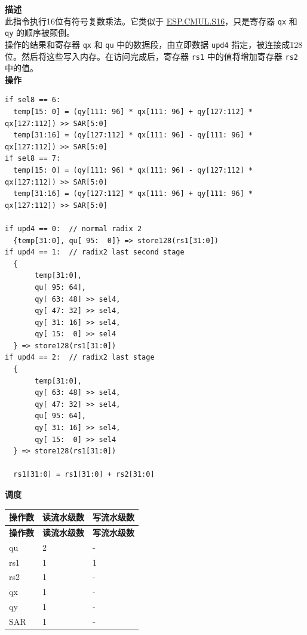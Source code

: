 \textbf{描述}\\
此指令执行16位有符号复数乘法。它类似于 \hyperref[instruction:ESPCMULS16]{ESP.CMUL.S16}，只是寄存器 \lstinline{qx} 和 \lstinline{qy} 的顺序被颠倒。\\
操作的结果和寄存器 \lstinline{qx} 和 \lstinline{qu} 中的数据段，由立即数据 \lstinline{upd4} 指定，被连接成128位。然后将这些写入内存。在访问完成后，寄存器 \lstinline{rs1} 中的值将增加寄存器 \lstinline{rs2} 中的值。\\
\textbf{操作}
\begin{lstlisting}
if sel8 == 6:
  temp[15: 0] = (qy[111: 96] * qx[111: 96] + qy[127:112] * qx[127:112]) >> SAR[5:0]
  temp[31:16] = (qy[127:112] * qx[111: 96] - qy[111: 96] * qx[127:112]) >> SAR[5:0]
if sel8 == 7:
  temp[15: 0] = (qy[111: 96] * qx[111: 96] - qy[127:112] * qx[127:112]) >> SAR[5:0]
  temp[31:16] = (qy[127:112] * qx[111: 96] + qy[111: 96] * qx[127:112]) >> SAR[5:0]

if upd4 == 0:  // normal radix 2
  {temp[31:0], qu[ 95:  0]} => store128(rs1[31:0])
if upd4 == 1:  // radix2 last second stage
  {
       temp[31:0],
       qu[ 95: 64],
       qy[ 63: 48] >> sel4,
       qy[ 47: 32] >> sel4,
       qy[ 31: 16] >> sel4,
       qy[ 15:  0] >> sel4
  } => store128(rs1[31:0])
if upd4 == 2:  // radix2 last stage
  {
       temp[31:0],
       qy[ 63: 48] >> sel4,
       qy[ 47: 32] >> sel4,
       qu[ 95: 64],
       qy[ 31: 16] >> sel4,
       qy[ 15:  0] >> sel4
  } => store128(rs1[31:0])

  rs1[31:0] = rs1[31:0] + rs2[31:0]
\end{lstlisting}

\textbf{调度}\\
\begin{longtable}[c]{|l|l|l|}
    \hline
    \rowcolor{lightgray}
    \textbf{操作数} & \textbf{读流水级数} & \textbf{写流水级数} \\\hline
    \endfirsthead
    \hline
    \rowcolor{lightgray}
     \textbf{操作数} & \textbf{读流水级数} & \textbf{写流水级数} \\\hline
    \endhead
    \hline
    \endfoot

  qu & 2 & - \\\hline
  rs1 & 1 & 1 \\\hline
  rs2 & 1 & - \\\hline
  qx & 1 & - \\\hline
  qy & 1 & - \\\hline
  SAR & 1 & -

\end{longtable}

